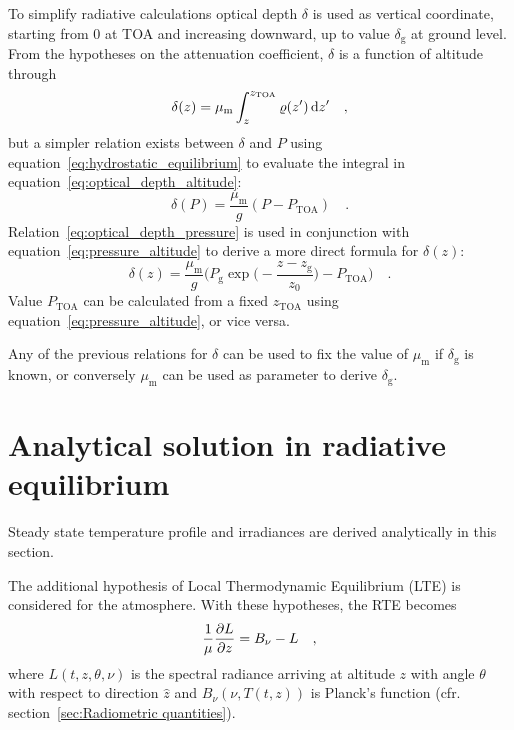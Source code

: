 \documentclass[a4paper,10pt,twocolumn,\classoptions]{article}
\newcommand{\zTOA}{z_\text{TOA}}
\newcommand{\PTOA}{P_\text{TOA}}
\begin{document}
To simplify radiative calculations optical depth $\delta$ is used as vertical coordinate, starting from \num{0} at TOA and increasing downward, up to value $\delta_\text{g}$ at ground level. From the hypotheses on the attenuation coefficient, $\delta$ is a function of altitude through
\begin{equation}
  \label{eq:optical_depth_altitude}
  \delta(z) = \mu_\text{m} \int_{z}^{\zTOA} \varrho(z') \odif{z'}
  \quad ,
\end{equation}
but a simpler relation exists between $\delta$ and $P$ using equation~\eqref{eq:hydrostatic_equilibrium} to evaluate the integral in equation~\eqref{eq:optical_depth_altitude}:
\begin{equation}
  \label{eq:optical_depth_pressure}
  \delta(P) = \frac{\mu_\text{m}}{g} (P - \PTOA)
  \quad .
\end{equation}
Relation~\eqref{eq:optical_depth_pressure} is used in conjunction with equation~\eqref{eq:pressure_altitude} to derive a more direct formula for $\delta(z)$:
\begin{equation}
  \label{eq:optical_depth_altitude_2}
  \delta(z) = \frac{\mu_\text{m}}{g} \bigg( P_\text{g} \exp{\bigg( - \frac{z - z_\text{g}}{z_0} \bigg)} - \PTOA \bigg)
  \quad .
\end{equation}
Value $\PTOA$ can be calculated from a fixed $\zTOA$ using equation~\eqref{eq:pressure_altitude}, or vice versa.

Any of the previous relations for $\delta$ can be used to fix the value of $\mu_\text{m}$ if $\delta_\text{g}$ is known, or conversely $\mu_\text{m}$ can be used as parameter to derive $\delta_\text{g}$.



\section{Analytical solution in radiative equilibrium}
\label{sec:Analytical solution in radiative equilibrium}
Steady state temperature profile and irradiances are derived analytically in this section.

The additional hypothesis of Local Thermodynamic Equilibrium (LTE) is considered for the atmosphere. %
With these hypotheses, the RTE becomes
\begin{equation}
  \label{eq:RTE_analytical}
  \frac{1}{\mu} \pdv{L}{z} = B_\nu - L
  \quad ,
\end{equation}
where $L(t, z, \theta, \nu)$ is the spectral radiance arriving at altitude $z$ with angle $\theta$ with respect to direction $\hat{z}$ and $B_\nu(\nu, T(t,z))$ is Planck's function (cfr. section~\ref{sec:Radiometric quantities}).
\end{document}
